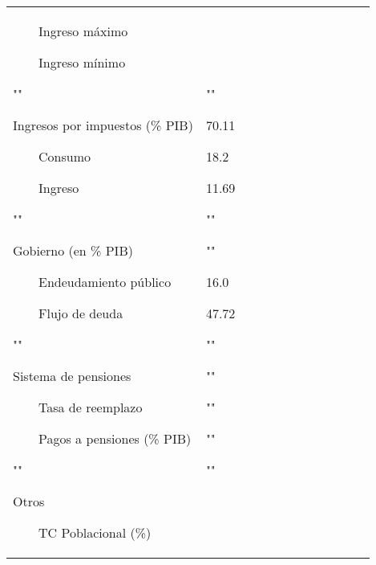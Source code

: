 \documentclass[10pt,a4paper]{report}
\newcommand{\tabitem}{~~\llap{\textbullet}~~}
\begin{document}
\begin{landscape}
\begin{longtable}{p{5cm} p{1cm} p{1cm} p{1cm} p{1cm} p{1cm} p{1cm} p{1cm} p{1cm} p{1cm} p{1cm} p{1cm}}
\par\tabitem Ingreso máximo

\par\tabitem Ingreso mínimo


\par ""

Ingresos por impuestos (\% PIB) 

\par\tabitem Consumo 

\par\tabitem Ingreso

\par ""

Gobierno (en \% PIB)
\par\tabitem Endeudamiento público 
\par\tabitem Flujo de deuda

\par ""

Sistema de pensiones 
\par\tabitem Tasa de reemplazo
\par\tabitem Pagos a pensiones (\% PIB)

\par ""

Otros
\par\tabitem TC Poblacional (\%)





&

\par ""
\par 70.11 
\par 18.2 
\par 11.69 

\par ""
\par ""
\par 16.0 
\par 47.72 
\par ""
\par ""
\par ""
\par ""
\par ""


\end{longtable}
\end{landscape}
\end{document}
